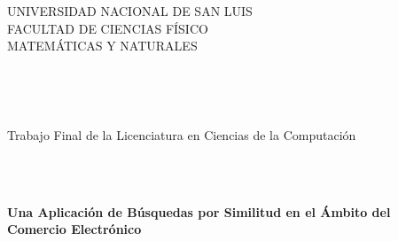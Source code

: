 
\begin{center}

\thispagestyle{empty}



\hspace{-3cm} %







\begin{center}

    
\end{center}





{\Large UNIVERSIDAD NACIONAL DE SAN LUIS} \\
\vspace{2mm}
{\Large FACULTAD DE CIENCIAS F\'ISICO} \\
\vspace{2mm}
{\Large MATEM\'ATICAS Y NATURALES}

\



\





{\Large {\sc Trabajo Final de la Licenciatura en Ciencias de la Computaci\'on}}\\





\



\





{\Large {\bf {Una Aplicación de B\'usquedas por Similitud en el \'Ambito del Comercio Electr\'onico }}}\\

\vspace{4mm}

\



\



\



\




\end{center}
